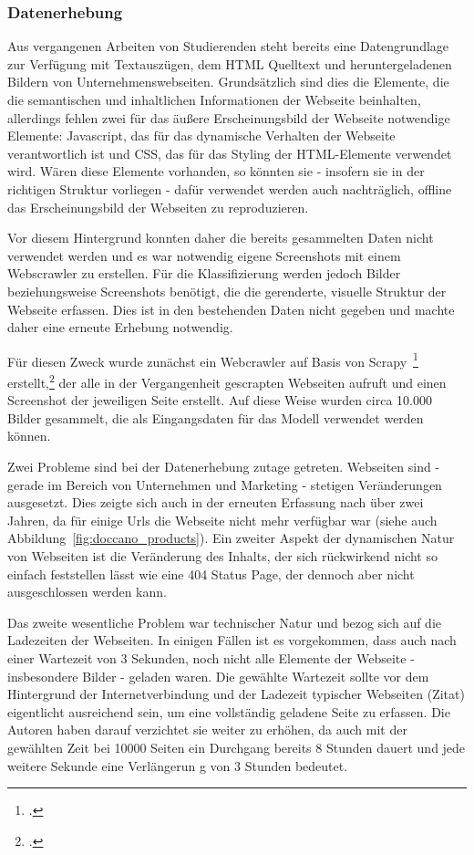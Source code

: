 \subsubsection{Datenerhebung}\label{subsubsec_class_datenerhebung}
Aus vergangenen Arbeiten von Studierenden steht bereits eine Datengrundlage zur Verfügung mit Textauszügen, dem HTML Quelltext und heruntergeladenen Bildern von Unternehmenswebseiten.
Grundsätzlich sind dies die Elemente, die die semantischen und inhaltlichen Informationen der Webseite beinhalten, allerdings fehlen zwei für das äußere Erscheinungsbild der Webseite notwendige Elemente:
Javascript, das für das dynamische Verhalten der Webseite verantwortlich ist und CSS, das für das Styling der HTML-Elemente verwendet wird.
Wären diese Elemente vorhanden, so könnten sie - insofern sie in der richtigen Struktur vorliegen - dafür verwendet werden auch nachträglich, offline das Erscheinungsbild der Webseiten zu reproduzieren.

Vor diesem Hintergrund konnten daher die bereits gesammelten Daten nicht verwendet werden und es war notwendig eigene Screenshots mit einem Webscrawler zu erstellen.
Für die Klassifizierung werden jedoch Bilder beziehungsweise Screenshots benötigt, die die gerenderte, visuelle Struktur der Webseite erfassen.
Dies ist in den bestehenden Daten nicht gegeben und machte daher eine erneute Erhebung notwendig.

Für diesen Zweck wurde zunächst ein Webcrawler auf Basis von Scrapy~\footcite[\vglf][]{zotero-328} erstellt,\footcite[\vglf][]{ostkamp2022a} der alle in der Vergangenheit gescrapten Webseiten aufruft und einen Screenshot der jeweiligen Seite erstellt.
Auf diese Weise wurden circa 10.000 Bilder gesammelt, die als Eingangsdaten für das Modell verwendet werden können.

Zwei Probleme sind bei der Datenerhebung zutage getreten.
Webseiten sind - gerade im Bereich von Unternehmen und Marketing - stetigen Veränderungen ausgesetzt. Dies zeigte sich auch in der erneuten Erfassung nach über zwei Jahren, da für einige Urls die Webseite nicht mehr verfügbar war (siehe auch Abbildung~\ref{fig:doccano_products}).
Ein zweiter Aspekt der dynamischen Natur von Webseiten ist die Veränderung des Inhalts, der sich rückwirkend nicht so einfach feststellen lässt wie eine 404 Status Page, der dennoch aber nicht ausgeschlossen werden kann.

Das zweite wesentliche Problem war technischer Natur und bezog sich auf die Ladezeiten der Webseiten. In einigen Fällen ist es vorgekommen, dass auch nach einer Wartezeit von 3 Sekunden, noch nicht alle Elemente der Webseite - insbesondere Bilder - geladen waren.
Die gewählte Wartezeit sollte vor dem Hintergrund der Internetverbindung und der Ladezeit typischer Webseiten (Zitat) eigentlicht ausreichend sein, um eine vollständig geladene Seite zu erfassen.
Die Autoren haben darauf verzichtet sie weiter zu erhöhen, da auch mit der gewählten Zeit bei 10000 Seiten ein Durchgang bereits 8 Stunden dauert und jede weitere Sekunde eine Verlängerun g von 3 Stunden bedeutet.

